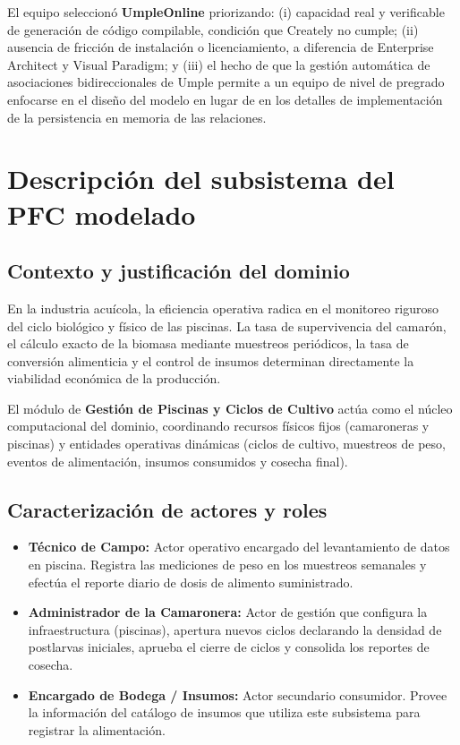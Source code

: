 \documentclass[11pt,a4paper]{article}
\begin{document}
El equipo seleccion\'o \textbf{UmpleOnline} priorizando: (i) capacidad real y verificable de generaci\'on de c\'odigo compilable, condici\'on que Creately no cumple; (ii) ausencia de fricci\'on de instalaci\'on o licenciamiento, a diferencia de Enterprise Architect y Visual Paradigm; y (iii) el hecho de que la gesti\'on autom\'atica de asociaciones bidireccionales de Umple permite a un equipo de nivel de pregrado enfocarse en el dise\~no del modelo en lugar de en los detalles de implementaci\'on de la persistencia en memoria de las relaciones.


\section{Descripci\'on del subsistema del PFC modelado}
\label{sec:descripcion}

\subsection{Contexto y justificaci\'on del dominio}
En la industria acu\'icola, la eficiencia operativa radica en el monitoreo riguroso del ciclo biol\'ogico y f\'isico de las piscinas. La tasa de supervivencia del camar\'on, el c\'alculo exacto de la biomasa mediante muestreos peri\'odicos, la tasa de conversi\'on alimenticia y el control de insumos determinan directamente la viabilidad econ\'omica de la producci\'on.

El m\'odulo de \textbf{Gesti\'on de Piscinas y Ciclos de Cultivo} act\'ua como el n\'ucleo computacional del dominio, coordinando recursos f\'isicos fijos (camaroneras y piscinas) y entidades operativas din\'amicas (ciclos de cultivo, muestreos de peso, eventos de alimentaci\'on, insumos consumidos y cosecha final).

\subsection{Caracterizaci\'on de actores y roles}
\begin{itemize}
    \item \textbf{T\'ecnico de Campo:} Actor operativo encargado del levantamiento de datos en piscina. Registra las mediciones de peso en los muestreos semanales y efect\'ua el reporte diario de dosis de alimento suministrado.
    \item \textbf{Administrador de la Camaronera:} Actor de gesti\'on que configura la infraestructura (piscinas), apertura nuevos ciclos declarando la densidad de postlarvas iniciales, aprueba el cierre de ciclos y consolida los reportes de cosecha.
    \item \textbf{Encargado de Bodega / Insumos:} Actor secundario consumidor. Provee la informaci\'on del cat\'alogo de insumos que utiliza este subsistema para registrar la alimentaci\'on.
\end{itemize}
\end{document}
